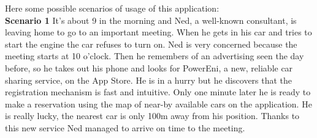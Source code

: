 Here some possible scenarios of usage of this application:\\
\bigbreak
\bigbreak
\textbf{\large Scenario 1}
\bigbreak
It's about 9 in the morning and Ned, a well-known consultant, is leaving home to go to an important meeting. When he gets in his car and tries to start the engine the car refuses to turn on. Ned is very concerned because the meeting starts at 10 o'clock. Then he remembers of an advertising seen the day before, so he takes out his phone and looks for PowerEni, a new, reliable car sharing service, on the App Store. He is in a hurry but he discovers that the registration mechanism is fast and intuitive. Only one minute later he is ready to make a reservation using the map of near-by available cars on the application. He is really lucky, the nearest car is only 100m away from his position. Thanks to this new service Ned managed to arrive on time to the meeting.